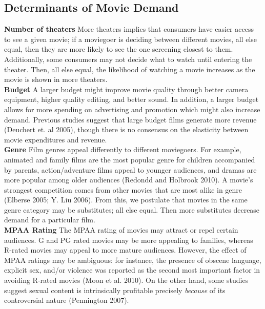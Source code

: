 \documentclass[10.7pt]{article} %
\begin{document}
\subsection{Determinants of Movie Demand} 
\setlength\parindent{0pt}

\begin{adjustwidth}{1cm}{}

\textbf{Number of theaters} \newline
More theaters implies that consumers have easier access to see a given movie; if a moviegoer is deciding between different movies, all else equal, then they are more likely to see the one screening closest to them. Additionally, some consumers may not decide what to watch until entering the theater. Then, all else equal, the likelihood of watching a movie increases as the movie is shown in more theaters. \\


\textbf{Budget}\newline
A larger budget might improve movie quality through better camera equipment, higher quality editing, and better sound. In addition, a larger budget allows for more spending on advertising and promotion which might also increase demand. Previous studies suggest that large budget films generate more revenue (Deuchert et. al 2005), though there is no consensus on the elasticity between movie expenditures and revenue.  
\\

\textbf{Genre}\newline
 Film genres appeal differently to different moviegoers. For example, animated and family films are the most popular genre for children accompanied by parents, action/adventure films appeal to younger audiences, and dramas are more popular among older audiences (Redondd and Holbrook 2010). A movie’s strongest competition comes from other movies that are most alike in genre (Elberse 2005; Y. Liu 2006). From this, we postulate that movies in the same genre category may be substitutes; all else equal. Then more substitutes decrease demand for a particular film. 
 \\

\textbf{MPAA Rating}\newline
The MPAA rating of movies may attract or repel certain audiences. G and PG rated movies may be more appealing to families, whereas R-rated movies may appeal to more mature audiences. However, the effect of MPAA ratings may be ambiguous: for instance, the presence of obscene language, explicit sex, and/or violence was reported as the second most important factor in avoiding R-rated movies (Moon et al. 2010). On the other hand, some studies suggest sexual content is intrinsically profitable precisely \textit{because} of its controversial nature (Pennington 2007). \\


\end{adjustwidth}
\end{document}
